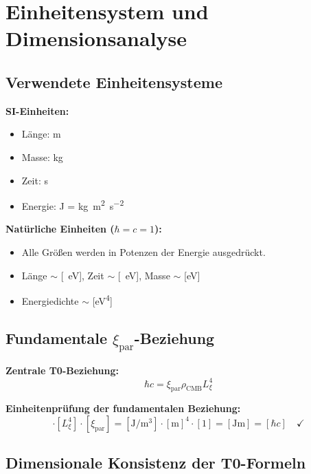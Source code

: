 \documentclass[12pt,a4paper]{article}
\theoremstyle{remark}
\begin{document}
	\section{Einheitensystem und Dimensionsanalyse}
	
	\subsection{Verwendete Einheitensysteme}
	
	\textbf{SI-Einheiten:}
	\begin{itemize}
		\item Länge: \si{\metre}
		\item Masse: \si{\kilogram}
		\item Zeit: \si{\second}
		\item Energie: \si{\joule} = \si{\kilogram\metre\squared\per\second\squared}
	\end{itemize}
	
	\textbf{Natürliche Einheiten (\(\hbar = c = 1\)):}
	\begin{itemize}
		\item Alle Größen werden in Potenzen der Energie ausgedrückt.
		\item Länge \(\sim\) [\si{\per\electronvolt}], Zeit \(\sim\) [\si{\per\electronvolt}], Masse \(\sim\) [\si{\electronvolt}]
		\item Energiedichte \(\sim\) [\si{\electronvolt\tothe{4}}]
	\end{itemize}
	
	\subsection{Fundamentale \(\xi_{\text{par}}\)-Beziehung}
	
	\textbf{Zentrale T0-Beziehung:}
	\begin{equation}
		\hbar c = \xi_{\text{par}} \rho_{\text{CMB}} L_{\xi}^4
	\end{equation}
	
	\textbf{Einheitenprüfung der fundamentalen Beziehung:}
	\begin{equation}
		[\rho_{\text{CMB}}] \cdot [L_{\xi}^4] \cdot [\xi_{\text{par}}] = [\si{\joule\per\cubic\metre}] \cdot [\si{\metre}]^4 \cdot [\text{1}] = [\si{\joule\metre}] = [\hbar c] \quad \checkmark
	\end{equation}
	
	\subsection{Dimensionale Konsistenz der T0-Formeln}
	
\end{document}
